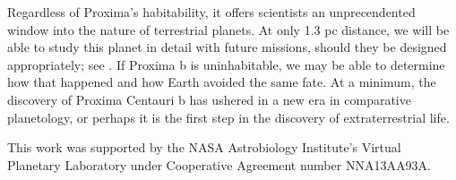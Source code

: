 \documentclass[preprint,12pt]{aastex}
\begin{document}
Regardless of Proxima's habitability, it offers scientists an
unprecendented window into the nature of terrestrial planets. At only
1.3 pc distance, we will be able to study this planet in detail with
future missions, should they be designed appropriately; see
\cite{Meadows16}. If Proxima b is uninhabitable, we may be able to
determine how that happened and how Earth avoided the same fate. At a
minimum, the discovery of Proxima Centauri b has ushered in a new era
in comparative planetology, or perhaps it is the first step in the
discovery of extraterrestrial life.
 
\vspace{1cm}
This work was supported by the NASA Astrobiology Institute's Virtual
Planetary Laboratory under Cooperative Agreement number NNA13AA93A.



\end{document}
